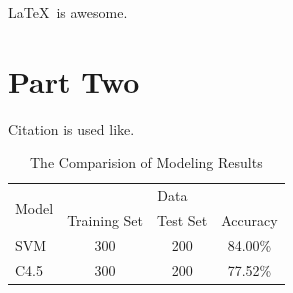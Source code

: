 \documentclass[12pt,english,openany,a4paper]{book}
\begin{document}
	
	
	\LaTeX~is awesome. \lipsum[1]
	
	\vspace{0.6cm}
	\begin{tcolorbox}[title=\textbf{tcolorbox example}]
		\lipsum[2]
	\end{tcolorbox}
	
	\chapter{Part Two}
	Citation is used like\cite{ex}.
	\begin{table}[b]
		\centering
		\begin{tabular}{lccc}
			\toprule
			\multirow{2}{*}{Model} & \multicolumn{3}{c}{Data} \\ \cmidrule(lr){2-4}
			& Training Set &  Test Set &  Accuracy \\
			\midrule
			SVM & 300 & 200 & 84.00\% \\
			C4.5 & 300 & 200 & 77.52\% \\
			\bottomrule
		\end{tabular}
		\caption{The Comparision of Modeling Results}
		\label{tab-label-2}
	\end{table}
	
\end{document}
